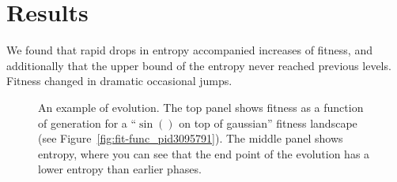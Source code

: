 \documentclass[11pt]{article}
\begin{document}
\section{Results}
\label{sec:orged0917a}

We found that rapid drops in entropy accompanied increases of fitness,
and additionally that the upper bound of the entropy never reached
previous levels.  Fitness changed in dramatic occasional jumps.

\begin{figure}[h]
  \centering
  \caption{An example of evolution.  The top panel shows fitness as a
    function of generation for a ``$\sin()$ on top of gaussian''
    fitness landscape (see Figure~\ref{fig:fit-func_pid3095791}).  The
    middle panel shows entropy, where you can see that the end point
    of the evolution has a lower entropy than earlier phases.}
  \label{fig:gen-info_pid3095791}
\end{figure}
\end{document}

